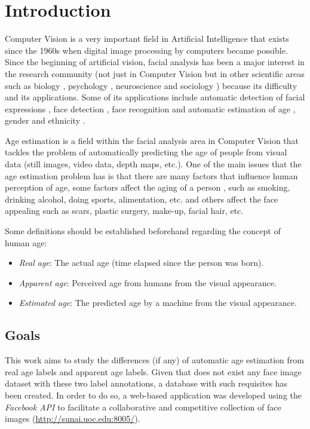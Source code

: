 \chapter{Introduction} \label{chap:introduction}

Computer Vision is a very important field in Artificial Intelligence that exists since the 1960s when digital image processing by computers became possible. Since the beginning of artificial vision, facial analysis has been a major interest in the research community (not just in Computer Vision but in other scientific areas such as biology \cite{bhl24064}, psychology \cite{ekm02}, neuroscience \cite{freiwald2009face} and sociology \cite{kemper1978social}) because its difficulty and its applications. Some of its applications include automatic detection of facial expressions \cite{cohen2003facial}, face detection \cite{hsu2002face}, face recognition \cite{wright2009robust} \cite{taigman2014deepface} and automatic estimation of age \cite{4359348}, gender \cite{alexandre2010gender} and ethnicity \cite{hosoi2004ethnicity}.

Age estimation is a field within the facial analysis area in Computer Vision that tackles the problem of automatically predicting the age of people from visual data (still images, video data, depth maps, etc.). One of the main issues that the age estimation problem has is that there are many factors that influence human perception of age, some factors affect the aging of a person \cite{shephard1997aging}, such as smoking, drinking alcohol, doing sports, alimentation, etc. and others affect the face appealing such as scars, plastic surgery, make-up, facial hair, etc.

Some definitions should be established beforehand regarding the concept of human age:
\begin{itemize}
	\item \textit{Real age}: The actual age (time elapsed since the person was born).
	\item \textit{Apparent age}: Perceived age from humans from the visual appearance. 
	\item \textit{Estimated age}: The predicted age by a machine from the visual appearance.
\end{itemize}

\section{Goals}
This work aims to study the differences (if any) of automatic age estimation from real age labels and apparent age labels. Given that does not exist any face image dataset with these two label annotations, a database with such requisites has been created. In order to do so, a web-based application was developed using the \textit{Facebook API} to facilitate a collaborative and competitive collection of face images (\url{http://sunai.uoc.edu:8005/}).

